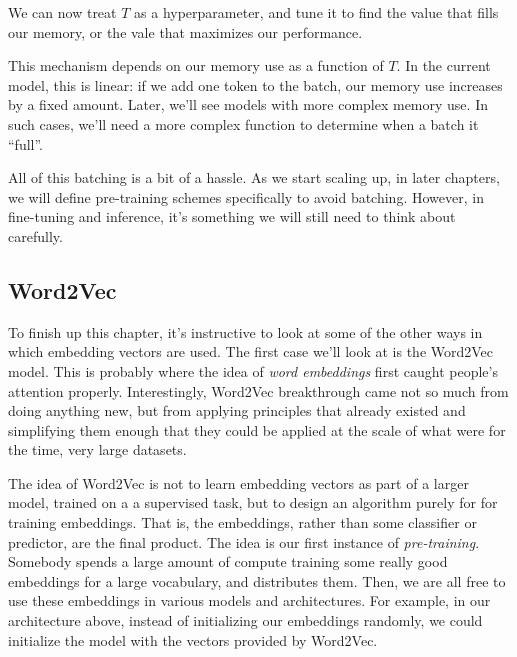 \documentclass{pca}
\newenvironment{aside}{
	\setlength{\leftskip}{1em}\par\itshape
}{
	
	\setlength{\leftskip}{0em}\par
}
\theoremstyle{theorem}
\theoremstyle{definition}
\theoremstyle{proof}
\begin{document}
We can now treat $T$ as a hyperparameter, and tune it to find the value that fills our memory, or the vale that maximizes our performance.

\begin{aside}
This mechanism depends on our memory use as a function of $T$. In the current model, this is linear: if we add one token to the batch, our memory use increases by a fixed amount. Later, we'll see models with more complex memory use. In such cases, we'll need a more complex function to determine when a batch it ``full''.
\end{aside}

All of this batching is a bit of a hassle. As we start scaling up, in later chapters, we will define pre-training schemes specifically to avoid batching. However, in fine-tuning and inference, it's something we will still need to think about carefully. 

\subsection{Word2Vec}

To finish up this chapter, it's instructive to look at some of the other ways in which embedding vectors are used. The first case we'll look at is the Word2Vec model. This is probably where the idea of \emph{word embeddings} first caught people's attention properly. Interestingly, Word2Vec breakthrough came not so much from doing anything new, but from applying principles that already existed and simplifying them enough that they could be applied at the scale of what were for the time, very large datasets.

The idea of Word2Vec is not to learn embedding vectors as part of a larger model, trained on a a supervised task, but to design an algorithm purely for for training embeddings. That is, the embeddings, rather than some classifier or predictor, are the final product. The idea is our first instance of \emph{pre-training}. Somebody spends a large amount of compute training some really good embeddings for a large vocabulary, and distributes them. Then, we are all free to use these embeddings in various models and architectures. For example, in our architecture above, instead of initializing our embeddings randomly, we could initialize the model with the vectors provided by Word2Vec.
\end{document}
